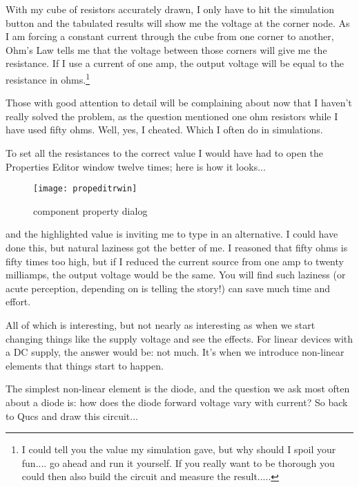 \addvspace{12pt}

With my cube of resistors accurately drawn, I only have to hit the
simulation button and the tabulated results will show me the voltage
at the corner node.  As I am forcing a constant current through the
cube from one corner to another, Ohm's Law tells me that the voltage
between those corners will give me the resistance.  If I use a current
of one amp, the output voltage will be equal to the resistance in
ohms.\footnote{I could tell you the value my simulation gave, but why
should I spoil your fun.... go ahead and run it yourself. If you
really want to be thorough you could then also build the circuit and
measure the result.....}

\addvspace{12pt}

Those with good attention to detail will be complaining about now that
I haven't really solved the problem, as the question mentioned one ohm
resistors while I have used fifty ohms.  Well, yes, I cheated.  Which
I often do in simulations.

\addvspace{12pt}

To set all the resistances to the correct value I would have had to
open the Properties Editor window twelve times; here is how it
looks...

\begin{figure}[ht]
  \centering
  \texttt{[image: propeditrwin]}
  \caption{component property dialog}
  \label{fig:propeditrwin}
\end{figure}
\FloatBarrier

and the highlighted value is inviting me to type in an alternative. I
could have done this, but natural laziness got the better of me. I
reasoned that fifty ohms is fifty times too high, but if I reduced the
current source from one amp to twenty milliamps, the output voltage
would be the same.  You will find such laziness (or acute perception,
depending on is telling the story!) can save much time and effort.
 

All of which is interesting, but not nearly as interesting as when we
start changing things like the supply voltage and see the effects. For
linear devices with a DC supply, the answer would be: not much.  It's
when we introduce non-linear elements that things start to happen.

\addvspace{12pt}

The simplest non-linear element is the diode, and the question we ask
most often about a diode is: how does the diode forward voltage vary
with current? So back to Qucs and draw this circuit...

